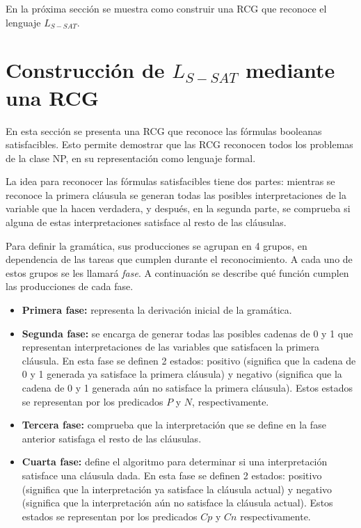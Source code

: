 \documentclass{article}
\begin{document}
En la próxima sección se muestra como construir una RCG que reconoce el lenguaje $L_{S-SAT}$.


\section{Construcción de $L_{S-SAT}$ mediante una RCG}
\label{sec:LSATRCG}

En esta sección se presenta una RCG que reconoce las fórmulas booleanas satisfacibles. Esto permite demostrar
que las RCG reconocen todos los problemas de la clase NP, en su representación como lenguaje formal.

La idea para reconocer las fórmulas satisfacibles tiene dos partes: mientras se reconoce la primera cláusula se generan todas las posibles interpretaciones de la variable que la hacen verdadera, y después, en la segunda parte, se comprueba si alguna de estas interpretaciones satisface al resto de las cláusulas.

Para definir la gramática, sus producciones se agrupan en 4 grupos, en dependencia de las tareas que cumplen durante el reconocimiento. A cada uno de estos grupos se les llamará \textit{fase}. A continuación se describe qué función cumplen las producciones de cada fase.

\begin{itemize}
    \item \textbf{Primera fase:} representa la derivación inicial de la gramática.
    \item \textbf{Segunda fase:} se encarga de generar todas las posibles cadenas de 0 y 1 que representan interpretaciones de las variables que satisfacen la primera cláusula. En esta fase se definen 2 estados: positivo (significa que la cadena de 0 y 1 generada ya satisface la primera cláusula) y negativo (significa que la cadena de 0 y 1 generada aún no satisface la primera cláusula). Estos estados se representan por los predicados $P$ y $N$, respectivamente.
    \item \textbf{Tercera fase:} comprueba que la interpretación que se define en la fase anterior satisfaga el resto de las cláusulas.
    \item \textbf{Cuarta fase:} define el algoritmo para determinar si una interpretación satisface una cláusula dada. En esta fase se definen 2 estados: positivo (significa que la interpretación ya satisface la cláusula actual) y negativo (significa que la interpretación aún no satisface la cláusula actual). Estos estados se representan por los predicados $Cp$ y $Cn$ respectivamente.
\end{itemize}
\end{document}
